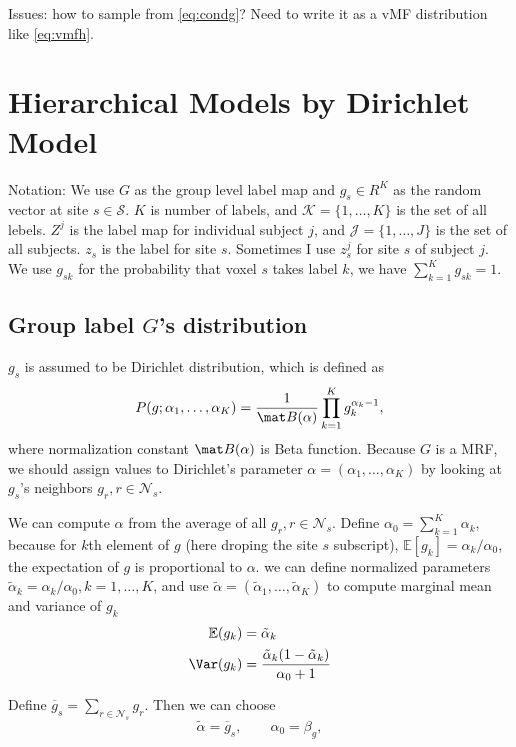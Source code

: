 \documentclass{article}
\begin{document}
Issues: how to sample from \eqref{eq:condg}? Need to write it as a vMF distribution like \eqref{eq:vmfh}.

\section{Hierarchical Models by Dirichlet Model}
Notation: We use $G$ as the group level label map and $g_s \in R^K$ as the random vector at site $s \in \mathcal{S}$. $K$ is number of labels, and $\mathcal{K} = \{1, \dots, K\}$ is the set of all lebels.  $Z^j$ is the label map for individual subject $j$, and $\mathcal{J} = \{1, \dots, J \}$ is the set of all subjects. $z_s$ is the label for site $s$. Sometimes I use $z_s^j$ for site $s$ of subject $j$. We use $g_{sk}$ for the probability that voxel $s$ takes label $k$, we have $\sum_{k = 1}^K g_{sk} = 1$.

\subsection{Group label $G$'s distribution}\label{sec:g}
$g_s$ is assumed to be Dirichlet distribution, which is defined as 
\begin{equation*}
  P(g; \alpha_1, \dots, \alpha_K) = \frac{1}{\mat B(\alpha)}\prod_{k=1}^K g_k^{\alpha_k - 1},
\end{equation*}
where normalization constant $\mat B(\alpha)$ is Beta function. Because $G$ is a MRF, we should assign values to Dirichlet's parameter $\alpha = (\alpha_1, \dots, \alpha_K)$ by looking at $g_s$'s neighbors $g_r, r \in \mathcal{N}_s$.

We can compute  $\alpha$ from the average of all $g_r, r\in \mathcal{N}_s$. Define $\alpha_0 = \sum_{k=1}^{K} \alpha_k$, because for $k$th element of $g$ (here droping the site $s$ subscript), $\mathbb{E}[g_k] = \alpha_k / \alpha_0$, the expectation of $g$ is proportional to $\alpha$. we can define  normalized parameters $\tilde \alpha_k = \alpha_k / \alpha_0, k=1, \dots, K$, and use $\tilde \alpha = (\tilde \alpha_1, \dots, \tilde \alpha_K)$ to compute marginal mean and variance of $g_k$ 
\begin{align}
  \mathbb{E}(g_k) &= \tilde \alpha_k\nonumber\\
  \Var(g_k) &= \frac{\tilde \alpha_k(1 - \tilde \alpha_k)}{\alpha_0 + 1} \label{eq:vargk}
\end{align}

Define $\overline{g}_s = \sum_{r\in \mathcal{N}_s} g_r$. Then we can choose 
\begin{equation}
  \tilde \alpha = \overline{g}_s, \qquad   \alpha_0 = \beta_g, \label{eq:alpha}
\end{equation}
\end{document}
